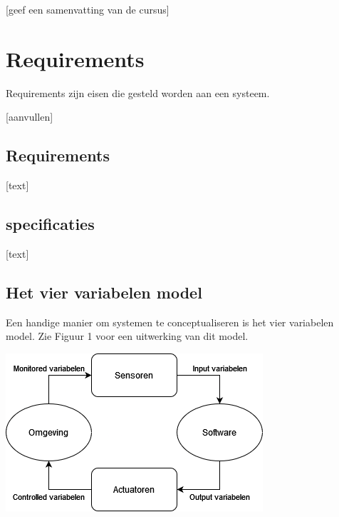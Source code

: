 \documentclass{article}
\begin{document}
	[geef een samenvatting van de cursus]
	
	\newpage
	
	
	\section{Requirements}
	
		Requirements zijn eisen die gesteld worden aan een systeem.

		[aanvullen]
		
		\subsection{Requirements}
		
		[text]
		
		\subsection{specificaties}
		
		[text]
		
		\subsection{Het vier variabelen model}
		
		Een handige manier om systemen te conceptualiseren is het vier variabelen model. Zie Figuur 1 voor een uitwerking van dit model.
		
		\begin{center}
			\begin{minipage}{0.48\linewidth}
				\includegraphics[width=\linewidth]{4variabelen.png}
			\end{minipage}
			\hfill
		\end{center}
\end{document}

